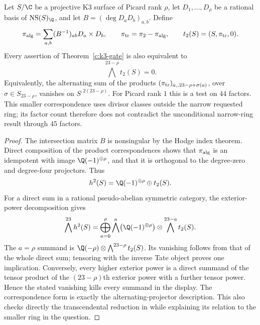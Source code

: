 \begin{corollary}
\label{c:k3-transcendental-gate}
Let $S/\C$ be a projective K3 surface of Picard rank $\rho$, let
$D_1,\ldots,D_\rho$ be a rational basis of $\operatorname{NS}(S)_\Q$,
and let $B=(\deg D_aD_b)_{a,b}$.  Define
\[
 \pi_{\rm alg}=\sum_{a,b}(B^{-1})_{ab}D_a\times D_b,
 \qquad \pi_{\rm tr}=\pi_2-\pi_{\rm alg},\qquad
 t_2(S)=(S,\pi_{\rm tr},0).
\]
Every assertion of Theorem~\ref{c:k3-gate} is also equivalent to
\[
 \bigwedge^{23-\rho}t_2(S)=0.
\]
Equivalently, the alternating sum of the products
$(\pi_{\rm tr})_{a,,23-\rho+\sigma(a)}$, over
$\sigma\in S_{23-\rho}$, vanishes on $S^{,2(23-\rho)}$.
For Picard rank $1$ this is a test on $44$ factors.  This smaller
correspondence uses divisor classes outside the narrow requested
ring; its factor count therefore does not contradict the unconditional
narrow-ring result through $45$ factors.
\end{corollary}

\begin{proof}
The intersection matrix $B$ is nonsingular by the Hodge index
theorem.  Direct composition of the product correspondences shows
that $\pi_{\rm alg}$ is an idempotent with image $\Q(-1)^{\oplus\rho}$,
and that it is orthogonal to the degree-zero and degree-four
projectors.  Thus
\[
 h^2(S)=\Q(-1)^{\oplus\rho}\oplus t_2(S).
\]
For a direct sum in a rational pseudo-abelian symmetric category,
the exterior-power decomposition gives
\[
 \bigwedge^{23}h^2(S)
 =\bigoplus_{a=0}^{\rho}
   \bigwedge^a\bigl(\Q(-1)^{\oplus\rho}\bigr)
       \otimes\bigwedge^{23-a}t_2(S).
\]
The $a=\rho$ summand is
$\Q(-\rho)\otimes\bigwedge^{23-\rho}t_2(S)$.
Its vanishing follows from that of the whole direct sum; tensoring
with the inverse Tate object proves one implication.
Conversely, every higher exterior power is a direct summand of
the tensor product of the $(23-\rho)$th exterior power with a
further tensor power.  Hence the stated vanishing kills every
summand in the display.  The correspondence form is exactly the
alternating-projector description.  This also checks directly the
transcendental reduction in \citet[\S2.5, pp.~506--507, equation~(7)]{c_yin2015}
while explaining its relation to the smaller ring in the question.
\end{proof}

